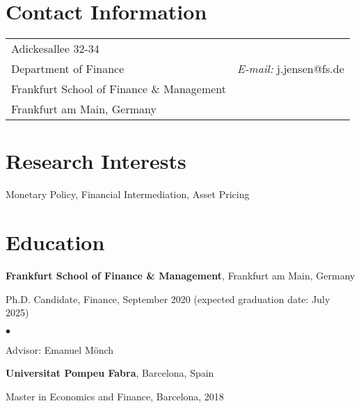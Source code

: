 \documentclass[margin,line]{res}
\newenvironment{list1}{
  \begin{list}{\ding{113}}{%
      \setlength{\itemsep}{0in}
      \setlength{\parsep}{0in} \setlength{\parskip}{0in}
      \setlength{\topsep}{0in} \setlength{\partopsep}{0in} 
      \setlength{\leftmargin}{0.17in}}}{\end{list}}
\newenvironment{list2}{
  \begin{list}{$\bullet$}{%
      \setlength{\itemsep}{0in}
      \setlength{\parsep}{0in} \setlength{\parskip}{0in}
      \setlength{\topsep}{0in} \setlength{\partopsep}{0in} 
      \setlength{\leftmargin}{0.2in}}}{\end{list}}
\begin{document}

\begin{resume}
\section{\sc Contact Information}
\vspace{.05in}
\begin{tabular}{@{}p{2in}p{4in}}
Adickesallee 32-34              \\            
Department of Finance   & {\it E-mail:}  j.jensen@fs.de \\         
Frankfurt School of Finance \& Management & \\       
Frankfurt am Main, Germany & \\     
\end{tabular}


\section{\sc Research Interests}
Monetary Policy, Financial Intermediation, Asset Pricing

\section{\sc Education}
{\bf Frankfurt School of Finance \& Management}, Frankfurt am Main, Germany\\
\vspace*{-.1in}
\begin{list1}
\item[] Ph.D. Candidate, Finance, September 2020 (expected
  graduation date: July 2025)
\begin{list2}
\vspace*{.05in}  
\item Advisor: Emanuel Mönch
\end{list2}

\end{list1}

{\bf Universitat Pompeu Fabra}, Barcelona, Spain\\
\vspace*{-.1in}
\begin{list1}
\item[] Master in Economics and Finance,  Barcelona, 2018
\end{list1}


\end{resume}
\end{document}
